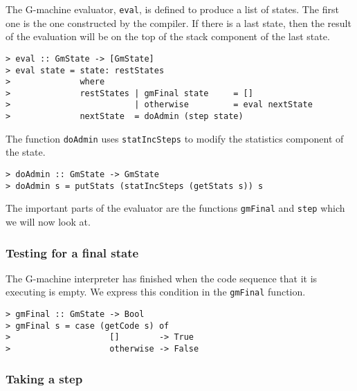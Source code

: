 The G-machine evaluator, \mbox{\tt eval}, is defined to produce a list of
states.  The first one is the one constructed by the compiler. If
there is a last state, then the result of the evaluation will be on
the top of the stack component of the last state.
\begin{verbatim}
> eval :: GmState -> [GmState]
> eval state = state: restStates
>              where
>              restStates | gmFinal state     = []
>                         | otherwise         = eval nextState
>              nextState  = doAdmin (step state)
\end{verbatim}
%
%
The function \mbox{\tt doAdmin} uses \mbox{\tt statIncSteps} to modify the statistics
component of the state.
\begin{verbatim}
> doAdmin :: GmState -> GmState
> doAdmin s = putStats (statIncSteps (getStats s)) s
\end{verbatim}
%
%
The important parts of the evaluator are the functions \mbox{\tt gmFinal} and
\mbox{\tt step} which we will now look at.

\subsubsection{Testing for a final state}

The G-machine interpreter has finished when the code sequence that it
is executing is empty. We express this condition in the \mbox{\tt gmFinal}
function.
\begin{verbatim}
> gmFinal :: GmState -> Bool
> gmFinal s = case (getCode s) of
>                    []        -> True
>                    otherwise -> False
\end{verbatim}
%
%
\subsubsection{Taking a step}

